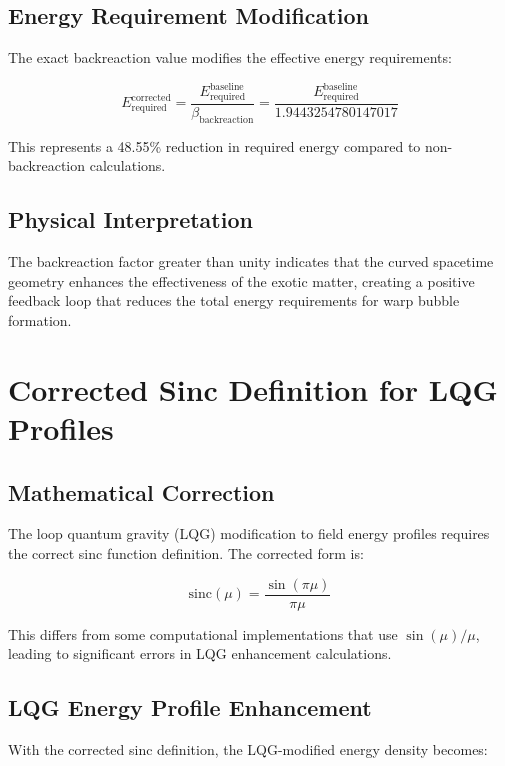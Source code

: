 \documentclass[11pt]{article}
\begin{document}
\subsection{Energy Requirement Modification}
The exact backreaction value modifies the effective energy requirements:

\begin{equation}
E_{\text{required}}^{\text{corrected}} = \frac{E_{\text{required}}^{\text{baseline}}}{\beta_{\text{backreaction}}} = \frac{E_{\text{required}}^{\text{baseline}}}{1.9443254780147017}
\end{equation}

This represents a 48.55\% reduction in required energy compared to non-backreaction calculations.

\subsection{Physical Interpretation}
The backreaction factor greater than unity indicates that the curved spacetime geometry enhances the effectiveness of the exotic matter, creating a positive feedback loop that reduces the total energy requirements for warp bubble formation.

\section{Corrected Sinc Definition for LQG Profiles}

\subsection{Mathematical Correction}
The loop quantum gravity (LQG) modification to field energy profiles requires the correct sinc function definition. The corrected form is:

\begin{equation}
\text{sinc}(\mu) = \frac{\sin(\pi\mu)}{\pi\mu}
\end{equation}

This differs from some computational implementations that use $\sin(\mu)/\mu$, leading to significant errors in LQG enhancement calculations.

\subsection{LQG Energy Profile Enhancement}
With the corrected sinc definition, the LQG-modified energy density becomes:
\end{document}
